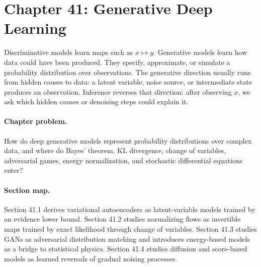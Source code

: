 \section{Chapter 41: Generative Deep Learning}
\label{ch:generative-deep-learning}

Discriminative models learn maps such as \(x\mapsto y\). Generative models learn how data could have been produced. They specify, approximate, or simulate a probability distribution over observations. The generative direction usually runs from hidden causes to data: a latent variable, noise source, or intermediate state produces an observation. Inference reverses that direction: after observing \(x\), we ask which hidden causes or denoising steps could explain it.

\paragraph{Chapter problem.}
How do deep generative models represent probability distributions over complex data, and where do Bayes' theorem, KL divergence, change of variables, adversarial games, energy normalization, and stochastic differential equations enter?

\paragraph{Section map.}
Section 41.1 derives variational autoencoders as latent-variable models trained by an evidence lower bound. Section 41.2 studies normalizing flows as invertible maps trained by exact likelihood through change of variables. Section 41.3 studies GANs as adversarial distribution matching and introduces energy-based models as a bridge to statistical physics. Section 41.4 studies diffusion and score-based models as learned reversals of gradual noising processes.


